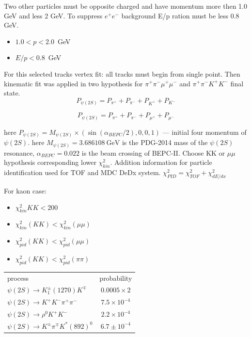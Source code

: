 \documentclass[a4paper,12pt]{article}
\newcommand{\ee}{e^{+}e^{-}}
\begin{document}
Two other particles must be opposite charged and have momentum more then 1.0
GeV and less 2 GeV. To suppress $\ee$ background E/p ration must be less 0.8
GeV.
\begin{itemize}
	\item $1.0<p<2.0$~GeV
	\item $E/p < 0.8$~GeV
\end{itemize}

For this selected tracks vertex fit: all tracks must begin from single point.
Then kinematic fit was applied in two hypothesis for $\pi^+\pi^-\mu^+\mu^-$ and
$\pi^+\pi^-K^+K^-$ final state. 
\[
	P_{\psi(2S)} = P_{\pi^+} +  P_{\pi^-} + P_{K^+} +  P_{K^-}
\]

\[
	P_{\psi(2S)} = P_{\pi^+} +  P_{\pi^-} + P_{\mu^+} +  P_{\mu^-}
\]

here  $P_{\psi(2S)} = M_{\psi(2S)}\times (\sin(\alpha_{BEPC}/2),0,0, 1)$ ---
initial four momentum of $\psi(2S)$.  here $M_{\psi(2S)} = 3.686108\
\mbox{GeV}$ is the PDG-2014 mass of the $\psi(2S)$ resonance,
$\alpha_{BEPC}=0.022$ is the beam crossing of BEPC-II. Choose KK or $\mu\mu$
hypothesis corresponding lower $\chi^2_{kin}$. Addition information for
particle identification used for TOF and MDC DeDx system.
$\chi^2_{PID} = \chi^2_{TOF} + \chi^2_{dE/dx}$

For kaon case:
\begin{itemize}
	\item $\chi^2_{kin}{KK} <200$
	\item $\chi^2_{kin}(KK) < \chi^2_{kin}(\mu\mu)$
	\item $\chi^2_{pid}(KK) < \chi^2_{pid}(\mu\mu)$
	\item $\chi^2_{pid}(KK) < \chi^2_{pid}(\pi\pi)$
\end{itemize}


\begin{table}
	\begin{tabular}{lc} \hline
		process &  probability \\ 
		$\psi(2S) \to K_1^{\pm}(1270) K^{\mp}$  & $0.0005 \times 2$ \\ 
		$\psi(2S) \to K^+K^-\pi^+\pi^-$   & $7.5 \times 10^{-4}$  \\
		$\psi(2S) \to \rho^0 K^+K^-$   & $2.2 \times 10^{-4}$  \\
	$\psi(2S) \to  K^\pm \pi^\mp K^{*}(892)^0$  &  $6.7\pm10^{-4}$
	\end{tabular}
\end{table}
\end{document}
